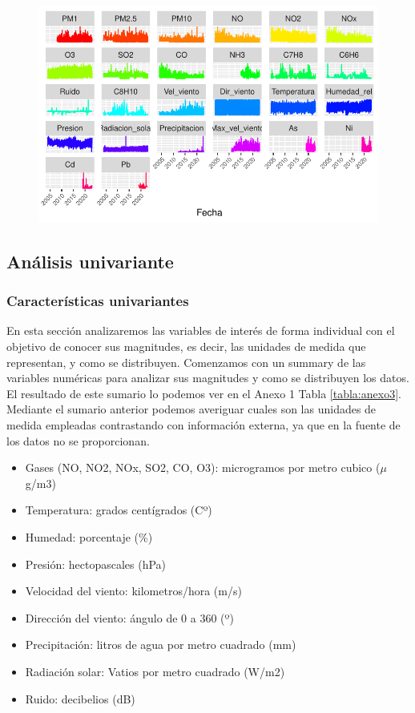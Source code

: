 \documentclass[notspecified,article,submit,moreauthors,pdftex]{Definitions/mdpi}
\providecommand{\tightlist}{%
  \setlength{\itemsep}{0pt}\setlength{\parskip}{0pt}}
\begin{document}
\begin{figure}

\includegraphics[width=0.7\linewidth]{ProyectoAED2023_files/figure-latex/periodos_variables-1} \hfill{}

\caption{\label{fig:periodos_variables}}\label{fig:periodos_variables}
\end{figure}

\hypertarget{anuxe1lisis-univariante}{%
\subsection{Análisis univariante}\label{anuxe1lisis-univariante}}

\hypertarget{caracteruxedsticas-univariantes}{%
\subsubsection{Características
univariantes}\label{caracteruxedsticas-univariantes}}

En esta sección analizaremos las variables de interés de forma
individual con el objetivo de conocer sus magnitudes, es decir, las
unidades de medida que representan, y como se distribuyen. Comenzamos
con un summary de las variables numéricas para analizar sus magnitudes y
como se distribuyen los datos. El resultado de este sumario lo podemos
ver en el Anexo 1 Tabla \ref{tabla:anexo3}. Mediante el sumario anterior
podemos averiguar cuales son las unidades de medida empleadas
contrastando con información externa, ya que en la fuente de los datos
no se proporcionan.

\begin{itemize}
\tightlist
\item
  Gases (NO, NO2, NOx, SO2, CO, O3): microgramos por metro cubico
  (\(\mu\)g/m3)
\item
  Temperatura: grados centígrados (Cº)
\item
  Humedad: porcentaje (\%)
\item
  Presión: hectopascales (hPa)
\item
  Velocidad del viento: kilometros/hora (m/s)
\item
  Dirección del viento: ángulo de 0 a 360 (º)
\item
  Precipitación: litros de agua por metro cuadrado (mm)
\item
  Radiación solar: Vatios por metro cuadrado (W/m2)
\item
  Ruido: decibelios (dB)
\end{itemize}
\end{document}
